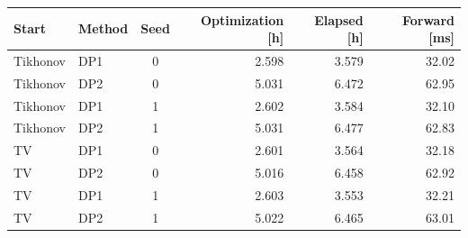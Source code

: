 \begingroup\small\setlength{\tabcolsep}{4pt}\renewcommand{\arraystretch}{1.1}
\begin{tabular}{@{}llcrrr@{}}
\toprule
Start & Method & Seed & Optimization [h] & Elapsed [h] & Forward [ms] \\ \midrule
Tikhonov & DP1 & 0 & 2.598 & 3.579 & 32.02 \\
Tikhonov & DP2 & 0 & 5.031 & 6.472 & 62.95 \\
Tikhonov & DP1 & 1 & 2.602 & 3.584 & 32.10 \\
Tikhonov & DP2 & 1 & 5.031 & 6.477 & 62.83 \\
TV & DP1 & 0 & 2.601 & 3.564 & 32.18 \\
TV & DP2 & 0 & 5.016 & 6.458 & 62.92 \\
TV & DP1 & 1 & 2.603 & 3.553 & 32.21 \\
TV & DP2 & 1 & 5.022 & 6.465 & 63.01 \\
\bottomrule
\end{tabular}\endgroup
